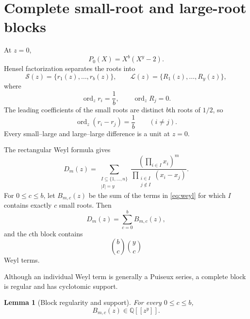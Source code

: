 \documentclass[11pt]{amsart}
\newtheorem{lemma}[theorem]{Lemma}
\theoremstyle{remark}
\newcommand{\Q}{\mathbb{Q}}
\newcommand{\cS}{\mathcal{S}}
\newcommand{\cL}{\mathcal{L}}
\newcommand{\ord}{\operatorname{ord}}
\begin{document}
\section{Complete small-root and large-root blocks}

At $z=0$,
\[
    P_0(X)=X^b(X^y-2).
\]
Hensel factorization separates the roots into
\[
    \cS(z)=\{r_1(z),\ldots,r_b(z)\},
    \qquad
    \cL(z)=\{R_1(z),\ldots,R_y(z)\},
\]
where
\begin{equation}\label{eq:rootorders}
    \ord_z r_i=\frac1b,
    \qquad
    \ord_z R_j=0.
\end{equation}
The leading coefficients of the small roots are distinct $b$th roots of $1/2$, so
\begin{equation}\label{eq:smalldifference}
    \ord_z(r_i-r_j)=\frac1b
    \qquad(i\neq j).
\end{equation}
Every small--large and large--large difference is a unit at $z=0$.

The rectangular Weyl formula gives
\begin{equation}\label{eq:weyl}
 D_m(z)=
 \sum_{\substack{I\subseteq\{1,\ldots,n\}\\ |I|=y}}
 \frac{\left(\prod_{i\in I}x_i\right)^m}
 {\displaystyle\prod_{\substack{i\in I\\j\notin I}}(x_i-x_j)}.
\end{equation}
For $0\leq c\leq b$, let $B_{m,c}(z)$ be the sum of the terms in \eqref{eq:weyl} for which $I$ contains exactly $c$ small roots.  Then
\begin{equation}\label{eq:blocksum}
    D_m(z)=\sum_{c=0}^{b}B_{m,c}(z),
\end{equation}
and the $c$th block contains
\begin{equation}\label{eq:blocksize}
    \binom bc\binom yc
\end{equation}
Weyl terms.

Although an individual Weyl term is generally a Puiseux series, a complete block is regular and has cyclotomic support.

\begin{lemma}[Block regularity and support]\label{lem:blockregularity}
For every $0\leq c\leq b$,
\begin{equation}\label{eq:blocksupport}
    B_{m,c}(z)\in\Q[[z^y]].
\end{equation}
\end{lemma}
\end{document}
